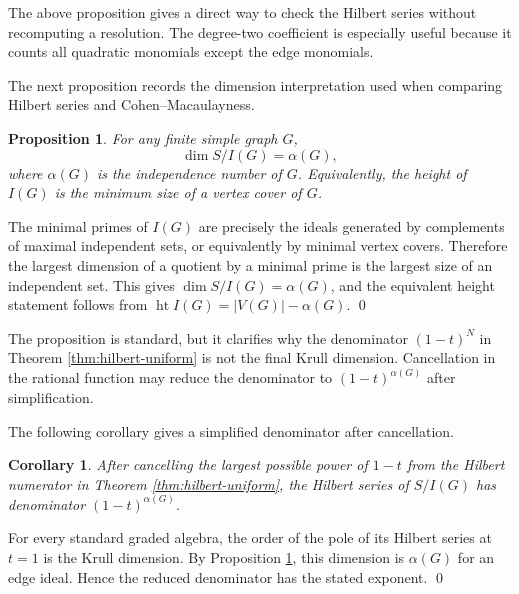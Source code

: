 \documentclass[12pt]{article}
\newtheorem{proposition}[theorem]{Proposition}
\newtheorem{corollary}[theorem]{Corollary}
\theoremstyle{definition}
\renewenvironment{proof}{{\bf \noindent Proof.}}{\qed}
\begin{document}
\medskip

The above proposition gives a direct way to check the Hilbert series without recomputing a resolution.  The degree-two coefficient is especially useful because it counts all quadratic monomials except the edge monomials.

\medskip

\noindent The next proposition records the dimension interpretation used when comparing Hilbert series and Cohen--Macaulayness.
\begin{proposition}\label{prop:dimension-independent-sets}
For any finite simple graph $G$,
$$
\dim S/I(G)=\alpha(G),
$$
where $\alpha(G)$ is the independence number of $G$.  Equivalently, the height of $I(G)$ is the minimum size of a vertex cover of $G$.
\end{proposition}

\begin{proof}
The minimal primes of $I(G)$ are precisely the ideals generated by complements of maximal independent sets, or equivalently by minimal vertex covers.  Therefore the largest dimension of a quotient by a minimal prime is the largest size of an independent set.  This gives $\dim S/I(G)=\alpha(G)$, and the equivalent height statement follows from $\operatorname{ht} I(G)=|V(G)|-\alpha(G)$.
\end{proof}

\medskip

The proposition is standard, but it clarifies why the denominator $(1-t)^N$ in Theorem \ref{thm:hilbert-uniform} is not the final Krull dimension.  Cancellation in the rational function may reduce the denominator to $(1-t)^{\alpha(G)}$ after simplification.

\medskip

\noindent The following corollary gives a simplified denominator after cancellation.
\begin{corollary}\label{cor:reduced-hilbert-denominator}
After cancelling the largest possible power of $1-t$ from the Hilbert numerator in Theorem \ref{thm:hilbert-uniform}, the Hilbert series of $S/I(G)$ has denominator $(1-t)^{\alpha(G)}$.
\end{corollary}

\begin{proof}
For every standard graded algebra, the order of the pole of its Hilbert series at $t=1$ is the Krull dimension.  By Proposition \ref{prop:dimension-independent-sets}, this dimension is $\alpha(G)$ for an edge ideal.  Hence the reduced denominator has the stated exponent.
\end{proof}
\end{document}
